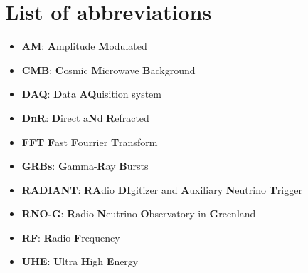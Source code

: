 \documentclass[11pt,a4paper,faculty=we,language=en,doctype=report]{cls/ugent-doc}
\begin{document}
\chapter{List of abbreviations}
\begin{itemize}
\item \textbf{AM}: \textbf{A}mplitude \textbf{M}odulated
\item \textbf{CMB}: \textbf{C}osmic \textbf{M}icrowave \textbf{B}ackground
\item \textbf{DAQ}: \textbf{D}ata \textbf{AQ}uisition system
\item \textbf{DnR}: \textbf{D}irect a\textbf{N}d \textbf{R}efracted
\item \textbf{FFT} \textbf{F}ast \textbf{F}ourrier \textbf{T}ransform
\item \textbf{GRBs}: \textbf{G}amma-\textbf{R}ay \textbf{B}ursts
\item \textbf{RADIANT}: \textbf{RA}dio \textbf{DI}gitizer and \textbf{A}uxiliary \textbf{N}eutrino \textbf{T}rigger
\item \textbf{RNO-G}: \textbf{R}adio \textbf{N}eutrino \textbf{O}bservatory in \textbf{G}reenland
\item \textbf{RF}: \textbf{R}adio \textbf{F}requency
\item \textbf{UHE}: \textbf{U}ltra \textbf{H}igh \textbf{E}nergy 
\end{itemize}
\end{document}
